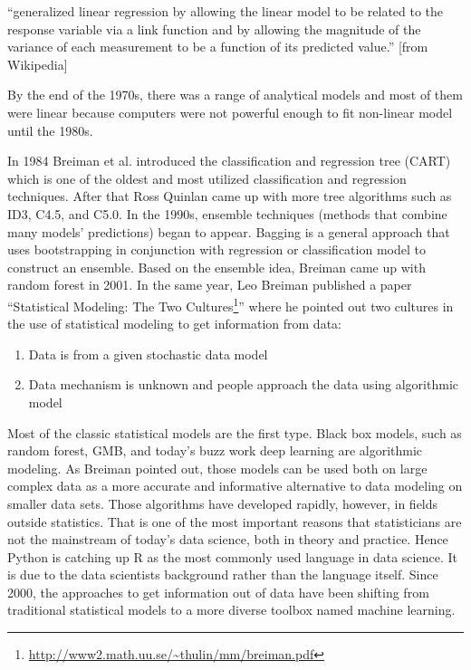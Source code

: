 \documentclass[12pt,]{krantz}
\providecommand{\tightlist}{%
  \setlength{\itemsep}{0pt}\setlength{\parskip}{0pt}}
\renewenvironment{quote}{\begin{VF}}{\end{VF}}
\renewcommand{\href}[2]{#2\footnote{\url{#1}}}
\begin{document}
\begin{quote}
``generalized linear regression by allowing the linear model to be related to the response variable via a link function and by allowing the magnitude of the variance of each measurement to be a function of its predicted value.'' {[}from Wikipedia{]}
\end{quote}

By the end of the 1970s, there was a range of analytical models and most of them were linear because computers were not powerful enough to fit non-linear model until the 1980s.

In 1984 Breiman et al\citep{Breiman1984}. introduced the classification and regression tree (CART) which is one of the oldest and most utilized classification and regression techniques. After that Ross Quinlan came up with more tree algorithms such as ID3, C4.5, and C5.0. In the 1990s, ensemble techniques (methods that combine many models' predictions) began to appear. Bagging is a general approach that uses bootstrapping in conjunction with regression or classification model to construct an ensemble. Based on the ensemble idea, Breiman came up with random forest in 2001\citep{Breiman2001}. In the same year, Leo Breiman published a paper ``\href{http://www2.math.uu.se/~thulin/mm/breiman.pdf}{Statistical Modeling: The Two Cultures}'' \citep{Breiman2001TwoCulture} where he pointed out two cultures in the use of statistical modeling to get information from data:

\begin{enumerate}
\def\labelenumi{(\arabic{enumi})}
\tightlist
\item
  Data is from a given stochastic data model\\
\item
  Data mechanism is unknown and people approach the data using algorithmic model
\end{enumerate}

Most of the classic statistical models are the first type. Black box models, such as random forest, GMB, and today's buzz work deep learning are algorithmic modeling. As Breiman pointed out, those models can be used both on large complex data as a more accurate and informative alternative to data modeling on smaller data sets. Those algorithms have developed rapidly, however, in fields outside statistics. That is one of the most important reasons that statisticians are not the mainstream of today's data science, both in theory and practice. Hence Python is catching up R as the most commonly used language in data science. It is due to the data scientists background rather than the language itself. Since 2000, the approaches to get information out of data have been shifting from traditional statistical models to a more diverse toolbox named machine learning.
\end{document}
